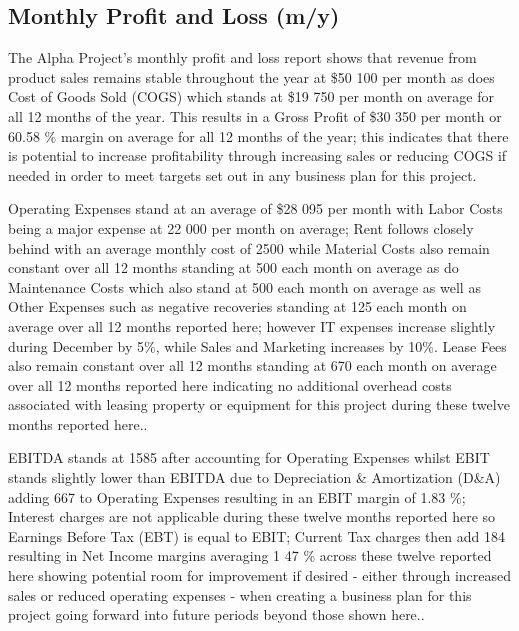 

\subsection{Monthly Profit and Loss (m/y)}\label{sec:title}

The Alpha Project's monthly profit and loss report shows that revenue from product sales remains stable throughout the year at \$50 100 per month as does Cost of Goods Sold (COGS) which stands at \$19 750 per month on average for all 12 months of the year. This results in a Gross Profit of \$30 350 per month or 60.58 \% margin on average for all 12 months of the year; this indicates that there is potential to increase profitability through increasing sales or reducing COGS if needed in order to meet targets set out in any business plan for this project. 

Operating Expenses stand at an average of \$28 095 per month with Labor Costs being a major expense at 22 000 per month on average; Rent follows closely behind with an average monthly cost of 2500 while Material Costs also remain constant over all 12 months standing at 500 each month on average as do Maintenance Costs which also stand at 500 each month on average as well as Other Expenses such as negative recoveries standing at 125 each month on average over all 12 months reported here; however IT expenses increase slightly during December by 5\%, while Sales and Marketing increases by 10\%. Lease Fees also remain constant over all 12 months standing at 670 each month on average over all 12 months reported here indicating no additional overhead costs associated with leasing property or equipment for this project during these twelve months reported here.. 

EBITDA stands at 1585 after accounting for Operating Expenses whilst EBIT stands slightly lower than EBITDA due to Depreciation & Amortization (D&A) adding 667 to Operating Expenses resulting in an EBIT margin of 1.83 \%; Interest charges are not applicable during these twelve months reported here so Earnings Before Tax (EBT) is equal to EBIT; Current Tax charges then add 184 resulting in Net Income margins averaging 1 47 \% across these twelve reported here showing potential room for improvement if desired - either through increased sales or reduced operating expenses - when creating a business plan for this project going forward into future periods beyond those shown here.. 

